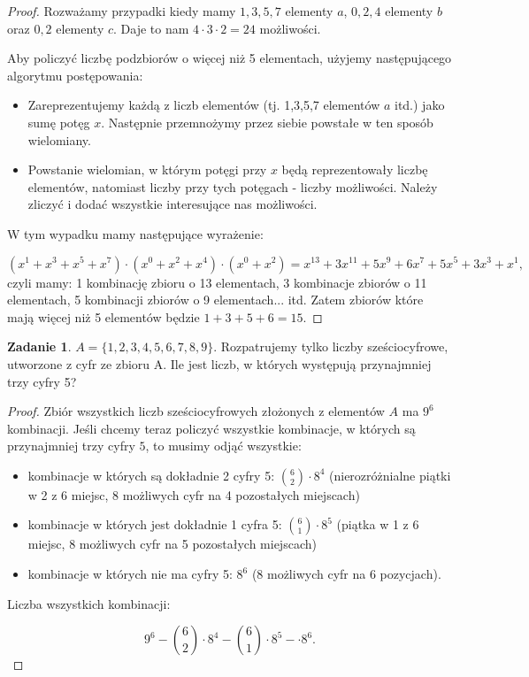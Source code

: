 \documentclass[11pt]{article}
\theoremstyle{definition}
\newtheorem{zadanie}{Zadanie}
\numberwithin{zadanie}{subsection}
\begin{document}
\begin{proof}
    Rozważamy przypadki kiedy mamy $1,3,5,7$ elementy $a$, $0,2,4$ elementy $b$ oraz $0,2$ elementy $c$. Daje to nam $4\cdot 3\cdot2 = 24$ możliwości.

    Aby policzyć liczbę podzbiorów o więcej niż 5 elementach, użyjemy następującego algorytmu postępowania:

    \begin{itemize}
        \item Zareprezentujemy każdą z liczb elementów (tj. 1,3,5,7 elementów $a$ itd.) jako sumę potęg $x$. Następnie przemnożymy przez siebie powstałe w ten sposób wielomiany.
        \item Powstanie wielomian, w którym potęgi przy $x$ będą reprezentowały liczbę elementów, natomiast liczby przy tych potęgach - liczby możliwości. Należy zliczyć i dodać wszystkie interesujące nas możliwości.
    \end{itemize}

    W tym wypadku mamy następujące wyrażenie:

    $$(x^1+x^3+x^5+x^7)\cdot(x^0+x^2+x^4)\cdot(x^0+x^2) =x^{13} + 3 x^{11} + 5 x^9 + 6 x^7 + 5 x^5 + 3 x^3 + x^1 ,$$
    czyli mamy: 1 kombinację zbioru o 13 elementach, 3 kombinacje zbiorów o 11 elementach, 5 kombinacji zbiorów o 9 elementach... itd. Zatem zbiorów które mają więcej niż 5 elementów będzie $1+3+5+6 = 15.$
\end{proof}

\begin{zadanie}
    $A=\{1,2,3,4,5,6,7,8,9\}$. Rozpatrujemy tylko liczby sześciocyfrowe, utworzone z cyfr ze zbioru A. Ile jest liczb, w których występują przynajmniej trzy cyfry 5?
\end{zadanie}

\begin{proof}
    Zbiór wszystkich liczb sześciocyfrowych złożonych z elementów $A$ ma $9^6$ kombinacji. Jeśli chcemy teraz policzyć wszystkie kombinacje, w których są przynajmniej trzy cyfry $5$, to musimy odjąć wszystkie:
    \begin{itemize}
        \item kombinacje w których są dokładnie 2 cyfry 5: $\binom 62\cdot8^4$ (nierozróżnialne piątki w 2 z 6 miejsc, 8 możliwych cyfr na 4 pozostałych miejscach)
        \item kombinacje w których jest dokładnie 1 cyfra 5: $\binom 61\cdot8^5$ (piątka w 1 z 6 miejsc, 8 możliwych cyfr na 5 pozostałych miejscach)
        \item kombinacje w których nie ma cyfry 5: $8^6$ (8 możliwych cyfr na 6 pozycjach).
    \end{itemize}

    Liczba wszystkich kombinacji:

    $$9^6 - \binom 62\cdot8^4-\binom 61\cdot8^5-\cdot8^6.$$

\end{proof}
\end{document}
